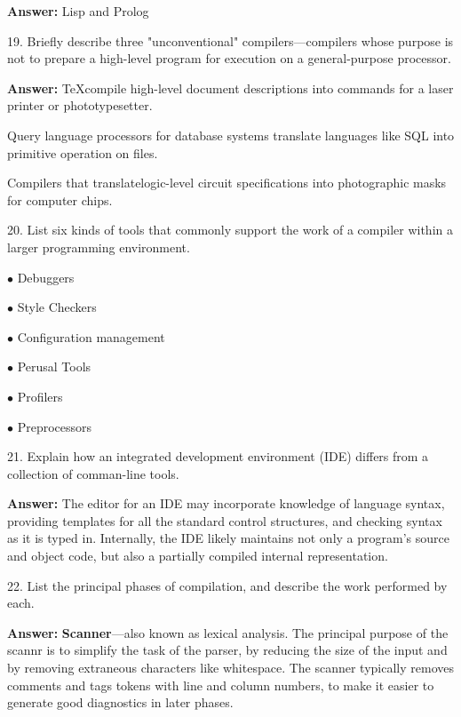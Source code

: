 \vskip 3mm
{\bf Answer:} Lisp and Prolog

\filbreak
\vskip 1cm

19. Briefly describe three "unconventional" compilers---compilers whose purpose is not to prepare a high-level program for execution on a general-purpose processor.

\vskip 3mm
{\bf Answer:} \TeX compile high-level document descriptions into commands for a laser printer or phototypesetter.

\vskip 2mm
Query language processors for database systems translate languages like SQL into primitive operation on files.

\vskip 2mm
Compilers that translatelogic-level circuit specifications into photographic masks for computer chips.

\filbreak
\vskip 1cm

20. List six kinds of tools that commonly support the work of a compiler within a larger programming environment.

\vskip 3mm
$\bullet$ Debuggers

\vskip 2mm
$\bullet$ Style Checkers

\vskip 2mm
$\bullet$ Configuration management

\vskip 2mm
$\bullet$ Perusal Tools

\vskip 2mm
$\bullet$ Profilers

$\bullet$ Preprocessors

\filbreak
\vskip 1cm
21. Explain how an integrated development environment (IDE) differs from a collection of comman-line tools.

\vskip 3mm
{\bf Answer:} The editor for an IDE may incorporate knowledge of language syntax, providing templates for all the standard control structures, and checking syntax as it is typed in. Internally, the IDE likely maintains not only a program's source and object code, but also a partially compiled internal representation.

\filbreak
\vskip 1cm

22. List the principal phases of compilation, and describe the work performed by each.

\vskip 3mm
{\bf Answer:} {\bf Scanner}---also known as lexical analysis. The principal purpose of the scannr is to simplify the task of the parser, by reducing the size of the input and by removing extraneous characters like whitespace. The scanner typically removes comments and tags tokens with line and column numbers, to make it easier to generate good diagnostics in later phases.

